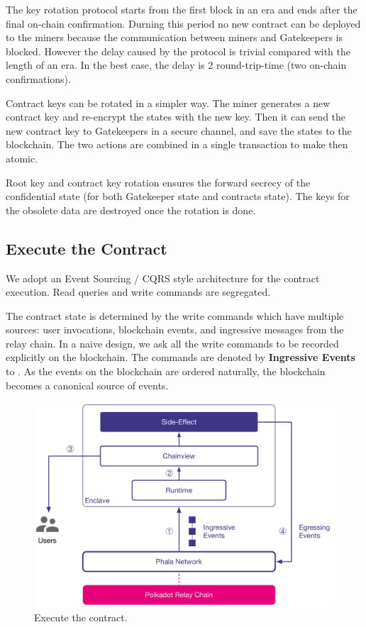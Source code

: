 The key rotation protocol starts from the first block in an era and ends after the final on-chain confirmation. Durning this period no new contract can be deployed to the miners because the communication between miners and Gatekeepers is blocked. However the delay caused by the protocol is trivial compared with the length of an era. In the best case, the delay is 2 round-trip-time (two on-chain confirmations).

Contract keys can be rotated in a simpler way. The miner generates a new contract key and re-encrypt the states with the new key. Then it can send the new contract key to Gatekeepers in a secure channel, and save the states to the blockchain. The two actions are combined in a single transaction to make then atomic.

Root key and contract key rotation ensures the forward secrecy of the confidential state (for both Gatekeeper state and contracts state). The keys for the obsolete data are destroyed once the rotation is done.



\subsection{Execute the Contract}

We adopt an Event Sourcing / CQRS style architecture for the contract execution. Read queries and write commands are segregated.

The contract state is determined by the write commands which have multiple sources: user invocations, blockchain events, and ingressive messages from the relay chain. In a naive design, we ask all the write commands to be recorded explicitly on the blockchain. The commands are denoted by \textbf{Ingressive Events} to \pruntime. As the events on the blockchain are ordered naturally, the blockchain becomes a canonical source of events.

\begin{figure}
    \centering \footnotesize
    \includegraphics[width=.7\columnwidth]{img/pLIBRA-execute}
    \caption{Execute the contract.}
    \label{fig:contract-execution}
\end{figure}

